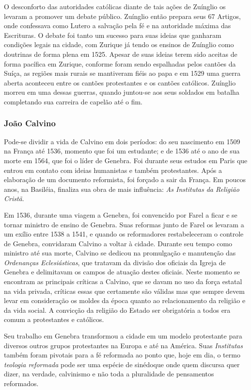 \documentclass[
    article,            %
	12pt,				%
	oneside,			%
	a4paper,			%
	chapter=TITLE,		%
	section=TITLE,		%
	english,			%
	french,				%
	spanish,			%
	brazil				%
	]{abntex2}
\begin{document}
O desconforto das autoridades católicas diante de tais ações de Zuínglio os levaram a promover um debate público. Zuínglio então prepara seus 67 Artigos, onde confessava como Lutero a salvação pela fé e na autoridade máxima das Escrituras. O debate foi tanto um sucesso para suas ideias que ganharam condições legais na cidade, com Zurique já tendo os ensinos de Zuínglio como doutrinas de forma plena em 1525. Apesar de suas ideias terem sido aceitas de forma pacífica em Zurique, conforme foram sendo espalhadas pelos cantões da Suíça, as regiões mais rurais se mantiveram fiéis ao papa e em 1529 uma guerra aberta aconteceu entre os cantões protestantes e os cantões católicos. Zuínglio morreu em uma dessas guerras, quando juntou-se aos seus soldados em batalha completando sua carreira de capelão até o fim.

\subsubsection{João Calvino}
Pode-se dividir a vida de Calvino em dois períodos: do seu nascimento em 1509 na França até 1536, momento que foi um estudante; e de 1536 até o ano de sua morte em 1564, que foi o líder de Genebra. Foi durante seus estudos em Paris que entrou em contato com ideias humanistas e também protestantes. Após a elaboração de um documento reformista, foi forçado a sair da França. Em poucos anos, na Basiléia, finaliza sua obra de mais influência: \emph{As Institutas da Religião Cristã}.

Em 1536, durante uma viagem a Genebra, foi convencido por Farel a ficar e se tornar ministro de ensino de Genebra. Suas reformas junto de Farel os levaram a um exílio entre 1538 a 1541, e quando os reformadores restabeleceram o controle de Genebra, convidaram Calvino a voltar à cidade. Durante seu tempo como ministro até sua morte, Calvino se dedicou na promulgação e manutenção das \emph{Ordenanças Eclesiásticas}, que tratavam da divisão dos oficiais da Igreja de Genebra e delimitavam os campos de atuação destes oficiais. Neste momento se encontram as principais críticas a Calvino, que se davam no uso da força estatal na vida privada, críticas essas que certamente são válidas mas que sempre devem levar em consideração os moldes da época quanto ao relacionamento da religião e da vida social. A convicção da religião do Estado ser obrigatória a todos era comum a protestantes e católicos. 

Seu trabalho em Genebra transformou a cidade em um modelo protestante para diversos outros grupos protestantes na Europa e até na América. Suas \emph{Institutas} também foram pivotais para a fé reformada ao ponto que, hoje em dia, o termo \emph{teologia reformada} pode ser uma espécie de sinédoque onde quem discursa quer dizer, na verdade, calvinismo e não toda a pluralidade de pensamentos reformados. 
\end{document}

